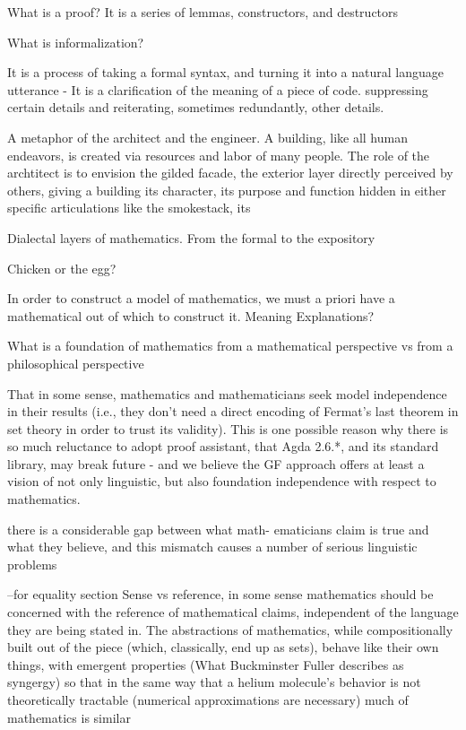   
What is a proof? It is a series of lemmas, constructors, and destructors

What is informalization? 

It is a process of taking a formal syntax, and turning it into a natural
language utterance -  It is a clarification of the meaning of a piece of
code. suppressing certain details and reiterating, sometimes
redundantly, other details.

A metaphor of the architect and the engineer.  A building, like all human
endeavors, is created via resources and labor of many people. The role of the archtitect
is to envision the gilded facade, the exterior layer directly perceived by
others, giving a building its character, its purpose and function hidden in
either specific articulations like the
smokestack,  its 

Dialectal layers of mathematics.  From the formal to the expository 

Chicken or the egg?

In order to construct a model of mathematics, we must a priori have a
mathematical out of which to construct it.  Meaning Explanations?

What is a foundation of mathematics from a mathematical perspective vs from a
philosophical perspective

That in some sense, mathematics and mathematicians seek model independence in
their results (i.e., they don't need a direct encoding of Fermat's last theorem
in set theory in order to trust its validity). This is one possible reason why
there is so much reluctance to adopt proof assistant, that Agda 2.6.*, and its
standard library, may break future   - and  we believe the GF approach offers at
least a vision of not only linguistic, but also foundation independence with
respect to mathematics.


there is a considerable gap between what math-
ematicians claim is true and what they believe, and this mismatch causes a
number of serious linguistic problems
\cite{ganesalingam2013language}

--for equality section
Sense vs reference, in some sense mathematics should be concerned with the
reference of mathematical claims, independent of the language they are being
stated in.  The abstractions of mathematics, while compositionally built out of
the piece (which, classically, end up as sets), behave like their own things,
with emergent properties (What Buckminster Fuller describes as syngergy)
so that in the same way that a helium molecule's behavior is not theoretically
tractable (numerical approximations are necessary) much of mathematics is similar

